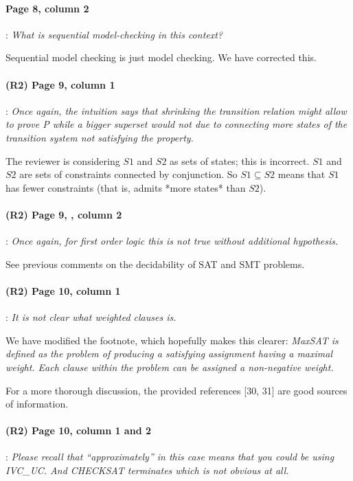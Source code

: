 \documentclass{article}
\begin{document}
\paragraph{Page 8, column 2}: \textit{What is sequential model-checking in this context?}
\vspace{0.05in}


\noindent Sequential model checking is just model checking. We have corrected this.


\paragraph{(R2) Page 9, column 1}: \textit{Once again, the intuition says that shrinking the transition relation might allow to prove P while a bigger superset would not due to connecting more states of the transition system not satisfying the property.}
\vspace{0.05in}

\noindent The reviewer is considering $S1$ and $S2$ as sets of states; this is incorrect.  $S1$ and $S2$ are sets of constraints connected by conjunction.  So $S1 \subseteq S2$ means that $S1$ has fewer constraints (that is, admits *more states* than $S2$).

\paragraph{(R2) Page 9, , column 2}: \textit{Once again, for first order logic this is not true without additional hypothesis.}
\vspace{0.05in}

\noindent See previous comments on the decidability of SAT and SMT problems.

\paragraph{(R2) Page 10, column 1}: \textit{It is not clear what weighted clauses is.}
\vspace{0.05in}

\noindent We have modified the footnote, which hopefully makes this clearer:
\textit{MaxSAT is defined as the problem of producing a satisfying assignment having a maximal {\em weight}.  Each clause within the problem can be assigned a non-negative weight.}

For a more thorough discussion, the provided references [30, 31] are good sources of information.


\paragraph{(R2) Page 10, column 1 and 2}: \textit{Please recall that “approximately” in this case means that you could be using IVC\_UC.  And CHECKSAT terminates which is not obvious at all.}
\vspace{0.05in}
\end{document}
